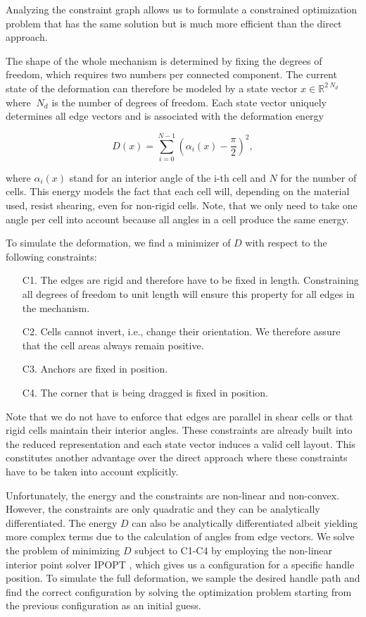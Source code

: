 Analyzing the constraint graph allows us to formulate a constrained optimization problem that has the same solution but is much more efficient than the direct approach.

The shape of the whole mechanism is determined by fixing the degrees of freedom, which requires two numbers per connected component. The current state of the deformation can therefore be modeled by a state vector $x\in\mathbb{R}^{2\ N_d}$ where $\ N_d$ is the number of degrees of freedom. Each state vector uniquely determines all edge vectors and is associated with the deformation energy

$$ D\left(x\right)=\sum_{i=0}^{N-1}\left(\alpha_i\left(x\right)-\frac{\pi}{2}\right)^2,$$

where $\alpha_i(x)$ stand for an interior angle of the i-th cell and $N$ for the number of cells. This energy models the fact that each cell will, depending on the material used, resist shearing, even for non-rigid cells. Note, that we only need to take one angle per cell into account because all angles in a cell produce the same energy. 

To simulate the deformation, we find a minimizer of $D$ with respect to the following constraints:

\begin{itemize}
	\item [C1.] The edges are rigid and therefore have to be fixed in length. Constraining all degrees of freedom to unit length will ensure this property for all edges in the mechanism.
	\item [C2.] Cells cannot invert, i.e., change their orientation. We therefore assure that the cell areas always remain positive.
	\item [C3.] Anchors are fixed in position.
    \item [C4.] The corner that is being dragged is fixed in position.
\end{itemize}
    
Note that we do not have to enforce that edges are parallel in shear cells or that rigid cells maintain their interior angles. These constraints are already built into the reduced representation and each state vector induces a valid cell layout. This constitutes another advantage over the direct approach where these constraints have to be taken into account explicitly.

Unfortunately, the energy and the constraints are non-linear and non-convex. However, the constraints are only quadratic and they can be analytically differentiated. The energy $D$ can also be analytically differentiated albeit yielding more complex terms due to the calculation of angles from edge vectors.
We solve the problem of minimizing $D$ subject to C1-C4 by employing the non-linear interior point solver IPOPT \cite{Waechter2006}, which gives us a configuration for a specific handle position. To simulate the full deformation, we sample the desired handle path and find the correct configuration by solving the optimization problem starting from the previous configuration as an initial guess.


